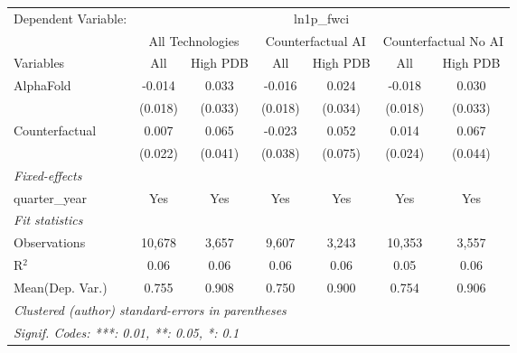 \begingroup
\centering
\begin{tabular}{lcccccc}
   \tabularnewline \midrule \midrule
   Dependent Variable: & \multicolumn{6}{c}{ln1p\_fwci}\\
 & \multicolumn{2}{c}{All Technologies} & \multicolumn{2}{c}{Counterfactual AI} & \multicolumn{2}{c}{Counterfactual No AI} \\
\cmidrule(lr){1-1}\cmidrule(lr){2-3} \cmidrule(lr){4-5} \cmidrule(lr){6-7}
Variables & \multicolumn{1}{c}{All} & \multicolumn{1}{c}{High PDB} & \multicolumn{1}{c}{All} & \multicolumn{1}{c}{High PDB} & \multicolumn{1}{c}{All} & \multicolumn{1}{c}{High PDB} \\
\cmidrule(lr){1-1}\cmidrule(lr){2-2} \cmidrule(lr){3-3} \cmidrule(lr){4-4} \cmidrule(lr){5-5} \cmidrule(lr){6-6} \cmidrule(lr){7-7}
   AlphaFold      & -0.014  & 0.033   & -0.016  & 0.024   & -0.018  & 0.030\\   
                  & (0.018) & (0.033) & (0.018) & (0.034) & (0.018) & (0.033)\\   
   Counterfactual & 0.007   & 0.065   & -0.023  & 0.052   & 0.014   & 0.067\\   
                  & (0.022) & (0.041) & (0.038) & (0.075) & (0.024) & (0.044)\\   
   \midrule
   \emph{Fixed-effects}\\
   quarter\_year  & Yes     & Yes     & Yes     & Yes     & Yes     & Yes\\  
   \midrule
   \emph{Fit statistics}\\
   Observations   & 10,678  & 3,657   & 9,607   & 3,243   & 10,353  & 3,557\\  
   R$^2$          & 0.06    & 0.06    & 0.06    & 0.06    & 0.05    & 0.06\\  
Mean(Dep. Var.) & 0.755 & 0.908 & 0.750 & 0.900 & 0.754 & 0.906 \\
   \midrule \midrule
   \multicolumn{7}{l}{\emph{Clustered (author) standard-errors in parentheses}}\\
   \multicolumn{7}{l}{\emph{Signif. Codes: ***: 0.01, **: 0.05, *: 0.1}}\\
\end{tabular}
\par\endgroup
